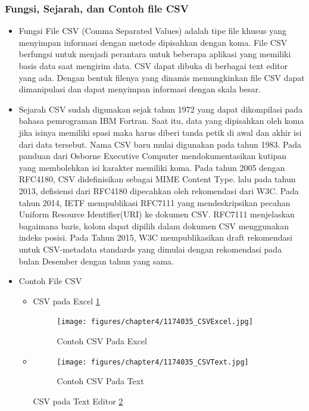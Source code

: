 \subsubsection{Fungsi, Sejarah, dan Contoh file CSV}
\begin{itemize}
	\item Fungsi \linebreak File CSV (Comma Separated Values) adalah tipe file khusus yang menyimpan informasi dengan metode dipisahkan dengan koma. File CSV berfungsi untuk menjadi perantara untuk beberapa aplikasi yang memiliki basis data saat mengirim data. CSV dapat dibuka di berbagai text editor
	yang ada. Dengan bentuk filenya yang dinamis memungkinkan file CSV dapat dimanipulasi dan dapat menyimpan informasi dengan skala besar.
	\item Sejarah \linebreak CSV sudah digunakan sejak tahun 1972 yang dapat dikompilasi pada bahasa pemrograman IBM Fortran. Saat itu, data yang dipisahkan oleh koma jika isinya memiliki spasi maka harus diberi tanda petik di awal dan akhir isi dari data tersebut. Nama CSV baru mulai digunakan pada tahun 1983. Pada panduan dari Osborne Executive Computer mendokumentasikan kutipan yang membolehkan isi karakter memiliki koma.  Pada tahun 2005 dengan RFC4180, CSV didefinisikan sebagai MIME Content Type. lalu pada tahun 2013, defisiensi dari RFC4180 dipecahkan oleh rekomendasi dari W3C. Pada tahun 2014, IETF mempublikasi RFC7111 yang mendeskripsikan pecahan Uniform Resource Identifier(URI) ke dokumen CSV. RFC7111 menjelaskan bagaimana baris, kolom dapat dipilih dalam dokumen CSV menggunakan indeks posisi. Pada Tahun 2015, W3C mempublikasikan draft rekomendasi untuk CSV-metadata standards yang dimulai dengan rekomendasi pada bulan Desember dengan tahun yang sama. 
	\item Contoh File CSV \begin{itemize}
							\item 
							CSV pada Excel \ref{1174035_CSVExcel}
							\begin{figure}[!htbp]
								\centering
								\texttt{[image: figures/chapter4/1174035\_CSVExcel.jpg]}
								\caption{Contoh CSV Pada Excel}
								\label{1174035_CSVExcel}
							\end{figure}
							\item \begin{figure}[!htbp]
								\centering
								\texttt{[image: figures/chapter4/1174035\_CSVText.jpg]}
								\caption{Contoh CSV Pada Text}
								\label{1174035_CSVText}
							\end{figure}
							CSV pada Text Editor \ref{1174035_CSVText}
							
						  \end{itemize}
\end{itemize}
